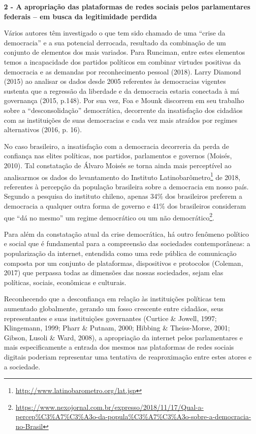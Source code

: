 \textbf{2 - A apropriação das plataformas de redes sociais pelos
parlamentares federais -- em busca da legitimidade perdida }

Vários autores têm investigado o que tem sido chamado de uma ``crise da
democracia'' e a sua potencial derrocada, resultado da combinação de um
conjunto de elementos dos mais variados. Para Runciman, entre estes
elementos temos a incapacidade dos partidos políticos em combinar
virtudes positivas da democracia e as demandas por reconhecimento
pessoal (2018). Larry Diamond (2015) ao analisar os dados desde 2005
referentes às democracias vigentes sustenta que a regressão da liberdade
e da democracia estaria conectada à má governança (2015, p.148). Por sua
vez, Foa e Mounk discorrem em seu trabalho sobre a ``desconsolidação''
democrática, decorrente da insatisfação dos cidadãos com as instituições
de suas democracias e cada vez mais atraídos por regimes alternativos
(2016, p. 16).

No caso brasileiro, a insatisfação com a democracia decorreria da perda
de confiança nas elites políticas, nos partidos, parlamentos e governos
(Moisés, 2010). Tal constatação de Álvaro Moisés se torna ainda mais
perceptível ao analisarmos os dados do levantamento do Instituto
Latinobarômetro\footnote{\url{http://www.latinobarometro.org/lat.jsp}}
de 2018, referentes à percepção da população brasileira sobre a
democracia em nosso país. Segundo a pesquisa do instituto chileno,
apenas 34\% dos brasileiros preferem a democracia a qualquer outra forma
de governo e 41\% dos brasileiros consideram que ``dá no mesmo'' um
regime democrático ou um não democrático\footnote{\url{https://www.nexojornal.com.br/expresso/2018/11/17/Qual-a-percep\%C3\%A7\%C3\%A3o-da-popula\%C3\%A7\%C3\%A3o-sobre-a-democracia-no-Brasil}}.

Para além da constatação atual da crise democrática, há outro fenômeno
político e social que é fundamental para a compreensão das sociedades
contemporâneas: a popularização da internet, entendida como uma rede
pública de comunicação composta por um conjunto de plataformas,
dispositivos e protocolos (Coleman, 2017) que perpassa todas as
dimensões das nossas sociedades, sejam elas políticas, sociais,
econômicas e culturais.

Reconhecendo que a desconfiança em relação às instituições políticas tem
aumentado globalmente, gerando um fosso crescente entre cidadãos, seus
representantes e suas instituições governantes (Curtice \& Jowell, 1997;
Klingemann, 1999; Pharr \& Putnam, 2000; Hibbing \& Theiss-Morse, 2001;
Gibson, Lusoli \& Ward, 2008), a apropriação da internet pelos
parlamentares e mais especificamente a entrada dos mesmos nas
plataformas de redes sociais digitais poderiam representar uma tentativa
de reaproximação entre estes atores e a sociedade.

